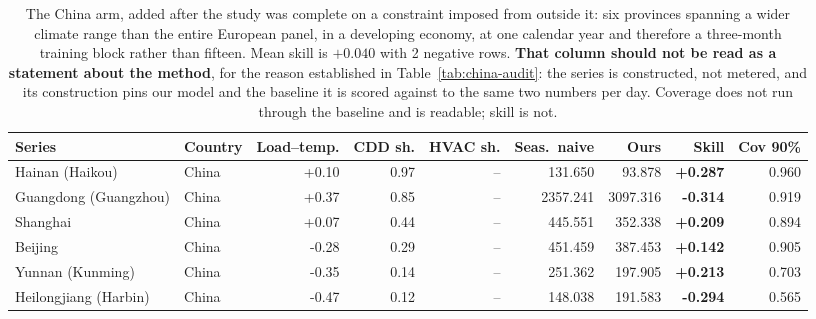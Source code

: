 \begin{table}[t]
\centering
\scriptsize
\setlength{\tabcolsep}{3pt}
\begin{tabular}{llrrrrrrr}
\toprule
Series & Country & Load--temp. & CDD sh. & HVAC sh. & Seas.\ naive & Ours & Skill & Cov 90\% \\
\midrule
Hainan (Haikou) & China & +0.10 & 0.97 & -- & 131.650 & 93.878 & \textbf{+0.287} & 0.960 \\
Guangdong (Guangzhou) & China & +0.37 & 0.85 & -- & 2357.241 & 3097.316 & \textbf{-0.314} & 0.919 \\
Shanghai & China & +0.07 & 0.44 & -- & 445.551 & 352.338 & \textbf{+0.209} & 0.894 \\
Beijing & China & -0.28 & 0.29 & -- & 451.459 & 387.453 & \textbf{+0.142} & 0.905 \\
Yunnan (Kunming) & China & -0.35 & 0.14 & -- & 251.362 & 197.905 & \textbf{+0.213} & 0.703 \\
Heilongjiang (Harbin) & China & -0.47 & 0.12 & -- & 148.038 & 191.583 & \textbf{-0.294} & 0.565 \\
\bottomrule
\end{tabular}
\caption{The China arm, added after the study was complete on a constraint imposed from outside it: six provinces spanning a wider climate range than the entire European panel, in a developing economy, at one calendar year and therefore a three-month training block rather than fifteen. Mean skill is $+0.040$ with 2 negative rows. \textbf{That column should not be read as a statement about the method}, for the reason established in Table~\ref{tab:china-audit}: the series is constructed, not metered, and its construction pins our model and the baseline it is scored against to the same two numbers per day. Coverage does not run through the baseline and is readable; skill is not.}
\label{tab:china}
\end{table}
